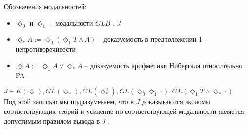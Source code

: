 \documentclass[12pt,a4paper,oneside]{article} \usepackage[left=2cm, right=2cm, top=1.3cm,
\begin{document}
  Обозначения модальностей:
  \begin{itemize}
    \item $\Diamond_0 $ и $\Diamond_1 $ -- модальности $GLB$ , $J$ 
    \item $\Diamond_* A := \Diamond_0 (\Diamond_1 T \wedge  A)$ -- доказуемость в предположении
          1-непротиворечивости
    \item $\Diamond A := \Diamond_1 A \vee  \Diamond_* A$ -- доказуемость арифметики Нибергаля
          относительно PA
  \end{itemize}

  \begin{lemma}
    $J \vdash  K(\Diamond ), GL(\Diamond_* ), GL(\Diamond_* ^2), GL(\Diamond_0 \Diamond_1 \cdot),
    GL(\Diamond_1 T \wedge  \Diamond_* \cdot)$ \\ Под этой записью мы подразумеваем, что в $J$
    доказываются аксиомы соответствующих теорий и усиление по соответствующей модальности является
    допустимым правилом вывода в $J$ .
  \end{lemma}
\end{document}
